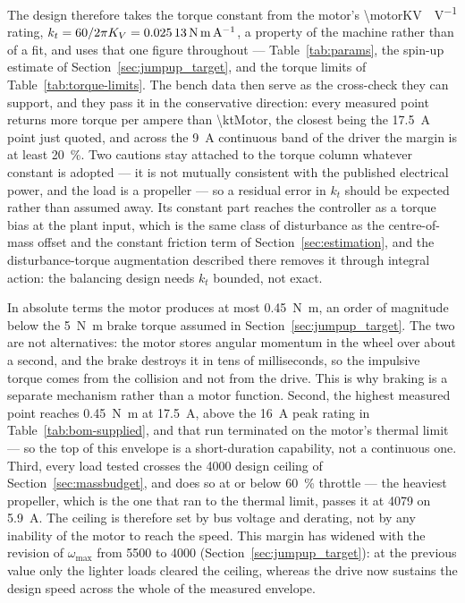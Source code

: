 The design therefore takes the torque constant from the motor's
\qty{\motorKV}{\rpm\per\volt} rating,
$k_t = 60/2\pi K_V = \qty{0.02513}{\newton\metre\per\ampere}$, a property of
the machine rather than of a fit, and uses that one figure throughout ---
Table~\ref{tab:params}, the spin-up estimate of
Section~\ref{sec:jumpup_target}, and the torque limits of
Table~\ref{tab:torque-limits}. The bench data then serve as the cross-check
they can support, and they pass it in the conservative direction: every
measured point returns more torque per ampere than \num{\ktMotor}, the closest
being the \qty{17.5}{\ampere} point just quoted, and across the
\qty{9}{\ampere} continuous band of the driver the margin is at least
\qty{20}{\percent}. Two cautions stay attached to the torque column whatever
constant is adopted --- it is not mutually consistent with the published
electrical power, and the load is a propeller --- so a residual error in $k_t$
should be expected rather than assumed away. Its constant part reaches the
controller as a torque bias at the plant input, which is the same class of
disturbance as the centre-of-mass offset and the constant friction term of
Section~\ref{sec:estimation}, and the disturbance-torque augmentation described
there removes it through integral action: the balancing design needs $k_t$
bounded, not exact.

In absolute terms the motor produces at most
\qty{0.45}{\newton\metre}, an order of magnitude below the
\qty{5}{\newton\metre} brake torque assumed in
Section~\ref{sec:jumpup_target}. The two are not
alternatives: the motor stores angular momentum in the wheel over about a
second, and the brake destroys it in tens of milliseconds, so the impulsive
torque comes from the collision and not from the drive. This is why braking is
a separate mechanism rather than a motor function. Second, the highest
measured point reaches
\qty{0.45}{\newton\metre} at \qty{17.5}{\ampere}, above the
\qty{16}{\ampere} peak rating in Table~\ref{tab:bom-supplied}, and that run
terminated on the motor's thermal limit --- so the top of this envelope is a
short-duration capability, not a continuous one. Third, every load tested
crosses the \qty{4000}{\rpm} design ceiling of Section~\ref{sec:massbudget},
and does so at or below \qty{60}{\percent} throttle --- the heaviest
propeller, which is the one that ran to the thermal limit, passes it at
\qty{4079}{\rpm} on \qty{5.9}{\ampere}. The ceiling is therefore set by bus
voltage and derating, not by any inability of the motor to reach the speed.
This margin has widened with the revision of $\omega_{\max}$ from
\qty{5500}{\rpm} to \qty{4000}{\rpm} (Section~\ref{sec:jumpup_target}): at the
previous value only the lighter loads cleared the ceiling, whereas the drive
now sustains the design speed across the whole of the measured envelope.

